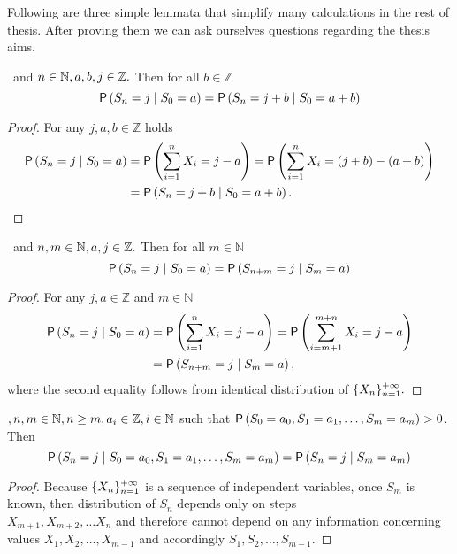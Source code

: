 \begin{rem}
  Following are three simple lemmata that simplify many calculations in the rest of thesis. After proving them we can ask ourselves questions regarding the thesis aims.
\end{rem}

\begin{lemma}\label{lemma-spatial_homogeneity}
  \Lrw\ and $n \in \mathbb{N}, a,b,j \in \mathbb{Z}.$ Then for all $b \in \mathbb Z$
\[
  \operatorname{\mathsf{P}} \left( S_n=j \mid S_0=a \right) =\operatorname{\mathsf{P}} \left( S_n=j+b \mid
    S_0=a+b \right)
\]
\end{lemma}

\begin{proof} For any $j, a, b \in \mathbb Z$ holds
  \[
    \begin{split}
      \pr \left( S_n=j \mid S_0=a \right) & =\pr \left( \suma X_i=j-a
      \right)
      =\pr \left( \suma X_i= \left( j+b \right) - \left( a+b \right) \right) \\
      & =\pr \left( S_n=j+b \mid S_0=a+b \right).
    \end{split}
 \]
\end{proof}


\begin{lemma}\label{lemma-temporal_homogeneity}
  \Lrw\ and $n,m \in \mathbb{N}, a,j \in \mathbb{Z}.$ Then for all $m \in \mathbb N$
   \[
     \operatorname{\mathsf{P}} \left( S_n=j \mid S_0=a \right) =\operatorname{\mathsf{P}} \left( S_{n+m}=j \mid
       S_m=a \right)
   \]
\end{lemma}
\begin{proof} For any $j, a \in \mathbb Z$ and $m \in \mathbb N$
  \[
    \begin{split}
      \pr \left( S_n=j \mid S_0=a \right) & =\pr \left( \suma X_i=j-a\right)
      =\pr \left( \suma[i][m+1][m+n]X_i=j-a \right)\\
      & =\pr \left( S_{n+m}=j \mid S_m=a \right),
    \end{split}
  \]
where the second equality follows from identical distribution of
$\{X_n\}_{n=1}^{{+\infty}}.$
\end{proof}

\begin{lemma}\label{lemma-markov_property}
 \Lrw $,n,m \in \mathbb{N}, n\geq m, a_i \in \mathbb{Z}, i\in \mathbb{N}$ such that $\operatorname{\mathsf{P}} \left(S_0=a_0, S_1=a_1, \ldots, S_m=a_m\right)>0$. Then
 \[
     \operatorname{\mathsf{P}} \left( S_n=j \mid S_0=a_0, S_1=a_1, \ldots, S_m=a_m \right)
     =\operatorname{\mathsf{P}} \left( S_n=j \mid S_m=a_m \right)
 \]
\end{lemma}
\begin{proof}
 Because $\{X_n\}_{n=1}^{+\infty}$ is a sequence of independent variables, once $S_m$ is known, then distribution of $S_n$ depends only on steps ~\\$X_{m+1}, X_{m+2}, \ldots X_n$ and therefore cannot depend on any information concerning values $X_1, X_2, \ldots, X_{m-1}$ and accordingly $S_1, S_2, \ldots, S_{m-1}.$
\end{proof}
